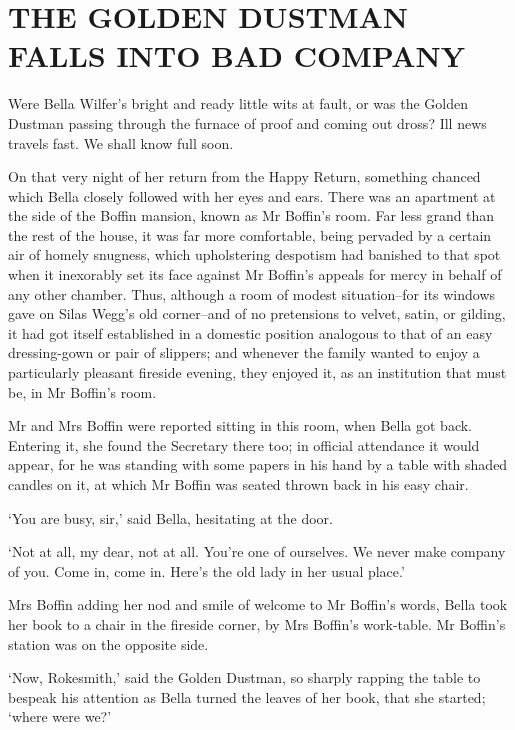 
\chapter{THE GOLDEN DUSTMAN FALLS INTO BAD COMPANY}

Were Bella Wilfer’s bright and ready little wits at fault, or was the
Golden Dustman passing through the furnace of proof and coming out
dross? Ill news travels fast. We shall know full soon.

On that very night of her return from the Happy Return, something
chanced which Bella closely followed with her eyes and ears. There was
an apartment at the side of the Boffin mansion, known as Mr Boffin’s
room. Far less grand than the rest of the house, it was far more
comfortable, being pervaded by a certain air of homely snugness, which
upholstering despotism had banished to that spot when it inexorably set
its face against Mr Boffin’s appeals for mercy in behalf of any other
chamber. Thus, although a room of modest situation--for its windows gave
on Silas Wegg’s old corner--and of no pretensions to velvet, satin, or
gilding, it had got itself established in a domestic position analogous
to that of an easy dressing-gown or pair of slippers; and whenever the
family wanted to enjoy a particularly pleasant fireside evening, they
enjoyed it, as an institution that must be, in Mr Boffin’s room.

Mr and Mrs Boffin were reported sitting in this room, when Bella got
back. Entering it, she found the Secretary there too; in official
attendance it would appear, for he was standing with some papers in his
hand by a table with shaded candles on it, at which Mr Boffin was seated
thrown back in his easy chair.

‘You are busy, sir,’ said Bella, hesitating at the door.

‘Not at all, my dear, not at all. You’re one of ourselves. We never
make company of you. Come in, come in. Here’s the old lady in her usual
place.’

Mrs Boffin adding her nod and smile of welcome to Mr Boffin’s words,
Bella took her book to a chair in the fireside corner, by Mrs Boffin’s
work-table. Mr Boffin’s station was on the opposite side.

‘Now, Rokesmith,’ said the Golden Dustman, so sharply rapping the table
to bespeak his attention as Bella turned the leaves of her book, that
she started; ‘where were we?’

